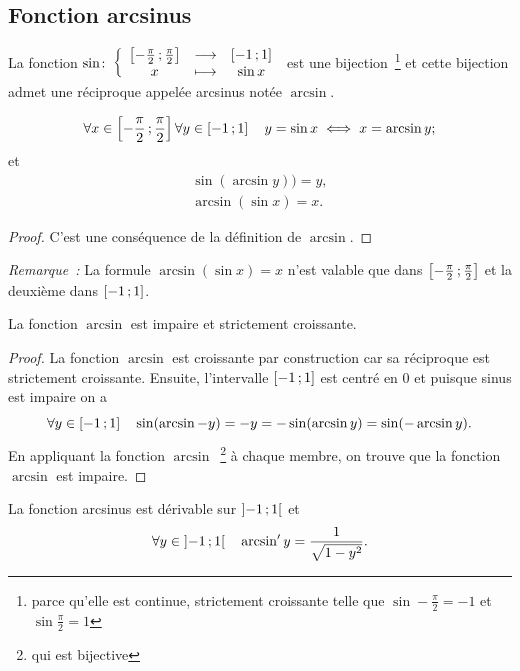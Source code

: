 \subsection{Fonction arcsinus}
\label{subsec:chap1-fonctionarcsinus}
\begin{defdef}
  La fonction \(\sin\colon \left\{\begin{array}{ccc} \left[ -\frac{\pi}{2} \, ;  \frac{\pi}{2} \right] & \longrightarrow &\left[ -1 \, ;  1 \right]\\ x & \longmapsto & \sin x \end{array} \right.\) est une bijection~\footnote{parce qu'elle est continue, strictement croissante telle que \(\sin -\frac{\pi}{2}=-1\)  et \(\sin \frac{\pi}{2}=1\)} et cette bijection admet une réciproque appelée arcsinus notée \(\arcsin\).
\end{defdef}
%
\begin{prop}
  \begin{equation}
    \forall x \in \left[ -\frac{\pi}{2} \, ;  \frac{\pi}{2} \right] \forall y \in \left[ -1 \, ;  1 \right] \quad y = \sin x \iff x = \arcsin y;
  \end{equation}
  et
  \begin{gather}
    \sin(\arcsin y)) = y, \\
    \arcsin(\sin x) = x.
  \end{gather}
\end{prop}
\begin{proof}
  C'est une conséquence de la définition de \(\arcsin\).
\end{proof}
\emph{Remarque~:} La formule \(\arcsin(\sin x) = x\) n'est valable que dans \(\left[ -\frac{\pi}{2} \, ;  \frac{\pi}{2} \right]\) et la deuxième dans \(\left[ -1 \, ;  1 \right]\).
%
\begin{prop}
  La fonction \(\arcsin\) est impaire et strictement croissante.
\end{prop}
\begin{proof}
  La fonction \(\arcsin\) est croissante par construction car sa réciproque est strictement croissante. Ensuite, l'intervalle \(\left[ -1 \, ;  1 \right]\) est centré en 0 et puisque sinus est impaire on a
  \begin{equation}
    \forall y \in \left[ -1 \, ;  1 \right] \quad \sin (\arcsin -y)=-y=-\sin(\arcsin y)=\sin (-\arcsin y).
  \end{equation}
  En appliquant la fonction \(\arcsin\)~\footnote{qui est bijective} à chaque membre, on trouve que la fonction \(\arcsin\) est impaire.
\end{proof}
%
\begin{prop}
  La fonction arcsinus est dérivable sur \(\left] -1 \, ;  1 \right[\) et
  \begin{equation}
    \forall y \in \left] -1 \, ;  1 \right[ \quad \arcsin'y = \frac{1}{\sqrt{1-y^2}}.
  \end{equation}
\end{prop}
